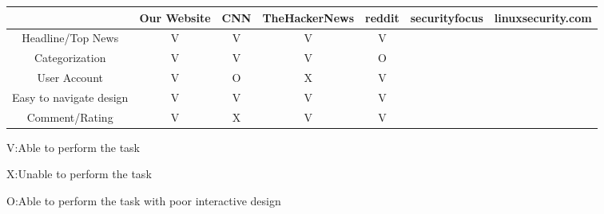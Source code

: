 \documentclass{article}
\begin{document}
\begin{table}[h!]
    \begin{tabular}{|c|c|c|c|c|c|c|}
    \hline
                   &  Our Website & CNN & TheHackerNews & reddit & securityfocus & linuxsecurity.com\\
    \hline
    Headline/Top News    &     V       &    V   &   V    &   V    &       &              \\
    \hline
    Categorization    &      V      &   V    &   V    &   O    &       &              \\
    \hline
    User Account    &     V      &   O    &    X   &   V    &       &             \\
    \hline
    Easy to navigate design    &      V      &   V    &   V    &  V     &       &              \\
    \hline
    Comment/Rating    &     V       &   X    &   V    &   V    &       &              \\ 
    \hline
    \end{tabular}
\end{table}
V:Able to perform the task\par
X:Unable to perform the task\par
O:Able to perform the task with poor interactive design\par
\end{document}
